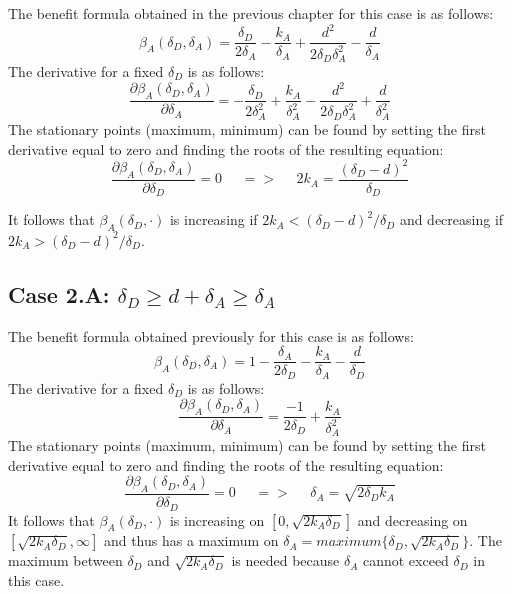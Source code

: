 The benefit formula obtained in the previous chapter for this case is as follows:
\begin{equation*}
\beta_{A}(\delta_{D},\delta_{A}) =\dfrac{\delta_{D}}{2\delta_{A}} - \dfrac{k_{A}}{\delta_{A}} + \dfrac{d^{2}}{2\delta_{D}\delta_{A}^{2}} - \dfrac{d}{\delta_{A}}
\end{equation*}
The derivative for a fixed $\delta_{D}$ is as follows:
\begin{equation*}
\dfrac{\partial \beta_{A}(\delta_{D},\delta_{A})}{\partial \delta_{A}} = -\dfrac{\delta_{D}}{2\delta_{A}^{2}} + \dfrac{k_{A}}{\delta_{A}^{2}} - \dfrac{d^{2}}{2\delta_{D}\delta_{A}^{2}} + \dfrac{d}{\delta_{A}^{2}}
\end{equation*}
The stationary points (maximum, minimum) can be found by setting the first derivative equal to zero and finding the roots of the resulting equation:
\begin{equation*}
\frac{\partial \beta_{A}(\delta_{D},\delta_{A})}{\partial \delta_{D}} =0 ~~~~~~ =>~~~~~~ 2k_{A} = \dfrac{(\delta_{D}-d)^{2}}{\delta_{D}}
\end{equation*}

It follows that $\beta_{A}(\delta_{D},\cdot)$ is increasing if $2k_{A} < (\delta_{D} - d)^{2} / \delta_{D}$ and decreasing if $2k_{A} > (\delta_{D} - d)^{2} / \delta_{D}$. \\

\subsection*{Case 2.A: $\delta_{D} \geq d+\delta_{A} \geq \delta_{A} $ }
The benefit formula obtained previously for this case is as follows:
\begin{equation*}
\beta_{A}(\delta_{D},\delta_{A}) =1- \dfrac{\delta_{A}}{2\delta_{D}} - \dfrac{k_{A}}{\delta_{A}} - \dfrac{d}{\delta_{D}}
\end{equation*}
The derivative for a fixed $\delta_{D}$ is as follows:
\begin{equation*}
\dfrac{\partial \beta_{A}(\delta_{D},\delta_{A})}{\partial \delta_{A}} = \dfrac{-1}{2\delta_{D}} + \dfrac{k_{A}}{\delta_{A}^{2}}
\end{equation*}
The stationary points (maximum, minimum) can be found by setting the first derivative equal to zero and finding the roots of the resulting equation:
\begin{equation*}
\frac{\partial \beta_{A}(\delta_{D},\delta_{A})}{\partial \delta_{D}} =0 ~~~~~~ =>~~~~~~ \delta_{A} = \sqrt{2\delta_{D}k_{A}}
\end{equation*}
It follows that $\beta_{A}(\delta_{D},\cdot)$ is increasing on $[0,\sqrt{2k_{A}\delta_{D}}]$ and decreasing on $[\sqrt{2k_{A}\delta_{D}}, \infty]$ and thus has a maximum on $\delta_{A} = maximum \{\delta_{D}, \sqrt{2k_{A}\delta_{D}} \} $. The maximum between $\delta_{D}$ and $ \sqrt{2k_{A}\delta_{D}}$ is needed because $\delta_{A} $ cannot exceed $\delta_{D}$ in this case. \\

